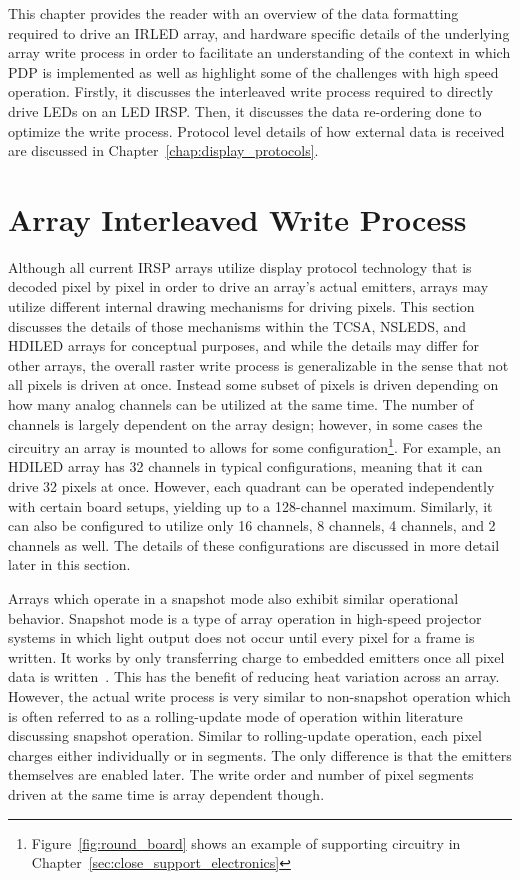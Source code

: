 \label{chap:array_write_process}
This chapter provides the reader with an overview of the data formatting required to drive an IRLED array, and hardware specific details of the underlying array write process in order to facilitate an understanding of the context in which PDP is implemented as well as highlight some of the challenges with high speed operation. Firstly, it discusses the interleaved write process required to directly drive LEDs on an LED IRSP. Then, it discusses the data re-ordering done to optimize the write process. Protocol level details of how external data is received are discussed in Chapter~\ref{chap:display_protocols}.


\section{Array Interleaved Write Process}
    \label{sec:array_Interleaved_write_process}
    Although all current IRSP arrays utilize display protocol technology that is decoded pixel by pixel in order to drive an array's actual emitters, arrays may utilize different internal drawing mechanisms for driving pixels. This section discusses the details of those mechanisms within the TCSA, NSLEDS, and HDILED arrays for conceptual purposes, and while the details may differ for other arrays, the overall raster write process is generalizable in the sense that not all pixels is driven at once. Instead some subset of pixels is driven depending on how many analog channels can be utilized at the same time. The number of channels is largely dependent on the array design; however, in some cases the circuitry an array is mounted to allows for some configuration\footnote{Figure~\ref{fig:round_board} shows an example of supporting circuitry in Chapter~\ref{sec:close_support_electronics}}. For example, an HDILED array has 32 channels in typical configurations, meaning that it can drive 32 pixels at once. However, each quadrant can be operated independently with certain board setups, yielding up to a 128-channel maximum. Similarly, it can also be configured to utilize only 16 channels, 8 channels, 4 channels, and 2 channels as well. The details of these configurations are discussed in more detail later in this section.

    Arrays which operate in a snapshot mode also exhibit similar operational behavior. Snapshot mode is a type of array operation in high-speed projector systems in which light output does not occur until every pixel for a frame is written. It works by only transferring charge to embedded emitters once all pixel data is written~\cite{McHughEtAl1999}. This has the benefit of reducing heat variation across an array. However, the actual write process is very similar to non-snapshot operation which is often referred to as a rolling-update mode of operation within literature discussing snapshot operation. Similar to rolling-update operation, each pixel charges either individually or in segments. The only difference is that the emitters themselves are enabled later. The write order and number of pixel segments driven at the same time is array dependent though.

